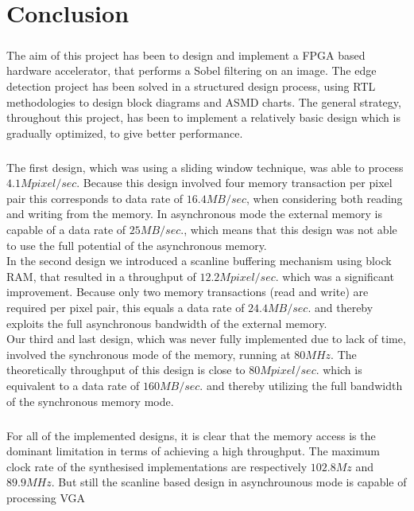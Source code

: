 \chapter{Conclusion}
\paragraph*{ }
The aim of this project has been to design and implement a FPGA based hardware accelerator, that performs a Sobel filtering on an image.
The edge detection project has been solved in a structured design process, using RTL methodologies to design block diagrams and  ASMD charts. The general strategy, throughout this project, has been to implement a relatively basic design which is gradually  optimized, to give better performance.
\paragraph*{ }
The first design, which was using a sliding window technique, was able to process $4.1M pixel/sec.$ Because this design involved four memory transaction per pixel pair this corresponds to data rate of $16.4MB/sec$, when considering both reading and writing from the memory. In asynchronous mode the external memory is capable of a data rate of $25MB/sec.$, which means that this design was not able to use the full potential of the asynchronous memory.\\
In the second design we introduced a scanline buffering mechanism using block RAM, that resulted in a throughput of $12.2M pixel/sec.$ which was a significant improvement. Because only two memory transactions (read and write) are required per pixel pair, this equals a data rate of $24.4MB/sec.$ and thereby exploits the full asynchronous bandwidth of the external memory. \\
Our third and last design, which was never fully implemented due to lack of time, involved the synchronous mode of the memory, running at $80MHz$. The theoretically throughput of this design is close to $80M pixel/sec.$ which is equivalent to a data rate of $160MB/sec.$ and thereby utilizing the full bandwidth of the synchronous memory mode.
\paragraph*{ }
For all of the implemented designs, it is clear that the memory access is the dominant limitation in terms of achieving a high throughput. The maximum clock rate of the synthesised implementations are respectively $102.8Mz$ and $89.9MHz$. But still the scanline based design in asynchrounous mode is capable of processing  VGA



\newpage